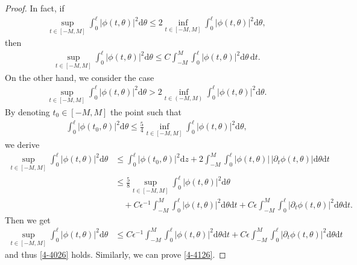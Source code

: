 \documentclass[10pt, reqno]{amsart}
\numberwithin{equation}{section}
\theoremstyle{definition}
\newcommand{\e}{\epsilon}
\def\p{\partial}
\begin{document}
{{\begin{proof}
\smallskip
\noindent
In fact,  if
\begin{align*}
\sup_{t\in [-M, M] }        \int_0^{\ell} |\phi(t, \theta)|^2 {\mathrm d} \theta  \le 2  \inf_{t \in [-M, M] }     \int_0^{\ell} |\phi(t, \theta)|^2 {\mathrm d} \theta,
\end{align*}
  then
\begin{align*}
\sup_{t\in [-M, M] }        \int_0^{\ell} |\phi(t, \theta)|^2 {\mathrm d} \theta  \le  C \int_{-M}^{M} \int_0^{\ell} |\phi(t, \theta)|^2 {\mathrm d} \theta\, {\mathrm d} t.
\end{align*}
  On the other hand,  we consider the case
\begin{align*}
\sup_{t\in [-M, M] }        \int_0^{\ell} |\phi(t, \theta)|^2 {\mathrm d} \theta  > 2  \inf_{t\in (- M,  M) }     \int_0^{\ell} |\phi(t, \theta)|^2 {\mathrm d} \theta.
\end{align*}
   By denoting $t_0 \in  [-M, M]$ the point such that
\begin{align*}
 \int_0^{\ell} |\phi(t_0, \theta)|^2 {\mathrm d} \theta   \le  \frac 54\inf_{t \in [-M, M] }     \int_0^{\ell} |\phi(t, \theta)|^2 {\mathrm d} \theta,
\end{align*}
we derive
\begin{align*}
  \sup_{t\in [-M, M] }     \int_0^{\ell} |\phi(t, \theta)|^2 {\mathrm d} \theta & \le     \int_0^{\ell} |\phi(t_0, \theta)|^2 {\mathrm d} z + 2 \int_{-M}^{M}   \int_0^{\ell}|\phi(t, \theta)|\, |\p_t\phi(t, \theta)| {\mathrm d} \theta{\mathrm d} t \nonumber
    \\[2mm]
 & \leq  \frac 58  \sup_{t\in [-M, M] }     \int_0^{\ell} |\phi(t, \theta)|^2 {\mathrm d} \theta
 \nonumber
    \\[2mm] & \quad
 +  C \e^{-1} \int_{-M}^{M}  \int_0^{\ell} |\phi(t, \theta)|^2 {\mathrm d} \theta{\mathrm d} t+   C\e \int_{-M}^{M}    \int_0^{\ell} |\p_t\phi(t, \theta)|^2 {\mathrm d} \theta{\mathrm d} t.
\end{align*}
   Then we get
\begin{align*}
 \sup_{t\in [-M, M] }     \int_0^{\ell} |\phi(t, \theta)|^2 {\mathrm d} \theta & \le   C \e^{-1}  \int_{-M}^{M}   \int_0^{\ell} |\phi(t, \theta)|^2 {\mathrm d} \theta {\mathrm d} t+ C\e  \int_{-M}^{M}  \int_0^{\ell} |\p_t\phi(t, \theta)|^2 {\mathrm d} \theta{\mathrm d} t
\end{align*}
 and thus \eqref{4-4026} holds.
 Similarly, we can prove \eqref{4-4126}.



\end{proof}}}
\end{document}
